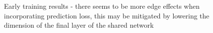\documentclass[10pt,letterpaper]{report}
\begin{document}
\begin{figure}%
	\centering
	\qquad
	\qquad
	\caption{Early training results - there seems to be more edge effects when incorporating prediction loss, this may be mitigated by lowering the dimension of the final layer of the shared network }
	\label{fig:overfit}
\end{figure}
\end{document}
